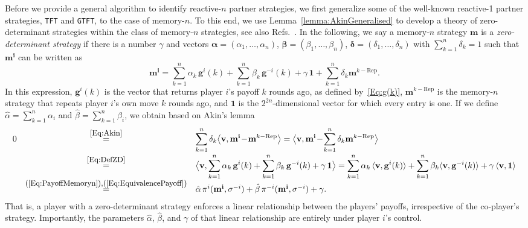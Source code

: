 \documentclass[9pt,twoside,lineno]{pnas-new}
\theoremstyle{plainCl1}
\theoremstyle{plainCl2}
\def\tft{\texttt{TFT}}
\def\gtft{\texttt{GTFT}}
\begin{document}
Before we provide a general algorithm to identify reactive-$n$ partner strategies, we first generalize some of the well-known reactive-1 partner strategies, \tft{} and \gtft{}, to the case of memory-$n$. 
To this end, we use Lemma~\ref{lemma:AkinGeneralised} to develop a theory of zero-determinant strategies within the class of memory-$n$ strategies, see also Refs.~\citep{ueda:RSOP:2021, Ueda:ORF:2022}.
In the following, we say a memory-$n$ strategy $\mathbf{m}$ is a {\it zero-determinant
strategy} if there is a number $\gamma$ and vectors $\boldsymbol{\alpha}\!=\!(\alpha_1,\ldots,\alpha_n)$, $\boldsymbol{\beta}\!=\!(\beta_1,\ldots,\beta_n)$, $\boldsymbol{\delta}\!=\!(\delta_1,\ldots,\delta_n)$ with $\sum_{k=1}^n \delta_k =1$ such that 
$\mathbf{m^{i}}$ can be written as
\begin{equation} \label{Eq:DefZD}
\mathbf{m^{i}} = \sum_{k=1}^n\alpha_k\, \mathbf{g}^i(k) + \sum_{k=1}^n\beta_k\, \mathbf{g}^{-i}(k) + \gamma\, \mathbf{1} + \sum_{k=1}^n \delta_k\mathbf{m}^{k-\text{Rep}}. 
\end{equation}
In this expression, $\mathbf{g}^i(k)$ is the vector that returns player $i$'s payoff $k$ rounds ago, as defined by~\eqref{Eq:g(k)}, $\mathbf{m}^{k-\text{Rep}}$ is the memory-$n$ strategy that repeats player $i$'s own move $k$ rounds ago, and $\mathbf{1}$ is the $2^{2n}$-dimensional vector for which every entry is one. If we define $\hat \alpha \!=\! \sum_{k=1}^n \alpha_i$ and $\hat \beta \!=\! \sum_{k=1}^n \beta_i$, we obtain based on Akin's lemma
\begin{equation} \label{Eq:PayoffZD}
\begin{array}{lcl}
0 
&\stackrel{\mbox{\small \eqref{Eq:Akin}}}{=}  
&\displaystyle \sum_{k=1}^n \delta_k \big\langle \mathbf{v} , \mathbf{m^i}\!-\!\mathbf{m}^{k-\text{Rep}}\big\rangle
 = \big\langle \mathbf{v} , \mathbf{m^i}\!-\!\sum_{k=1}^n \delta_k\mathbf{m}^{k-\text{Rep}}\big\rangle\\[0.4cm]
&\displaystyle \stackrel{\mbox{\small \eqref{Eq:DefZD}}}{=} 
&\displaystyle \big\langle \mathbf{v} ,\sum_{k=1}^n\alpha_k\, \mathbf{g}^i(k) + \sum_{k=1}^n\beta_k\, \mathbf{g}^{-i}(k) + \gamma\, \mathbf{1} \big\rangle
= \sum_{k=1}^n\alpha_k \, \langle \mathbf{v},\mathbf{g}^i(k)\rangle + \sum_{k=1}^n\beta_k \langle \mathbf{v},\mathbf{g}^{-i}(k) \rangle+\gamma\,\langle\mathbf{v},\mathbf{1}\rangle\\[0.3cm]
&\stackrel{\mbox{\small (\ref{Eq:PayoffMemoryn}),(\ref{Eq:EquivalencePayoff})}}{=} 
&\hat \alpha \, \pi^i(\mathbf{m^i},\sigma^{-i}) + \hat \beta \, \pi^{-i}(\mathbf{m^i},\sigma^{-i}) + \gamma.
\end{array}
\end{equation}
That is, a player with a zero-determinant strategy enforces a linear relationship between the players' payoffs, irrespective of the co-player's strategy. 
Importantly, the parameters $\hat \alpha$, $\hat \beta$, and $\gamma$ of that linear relationship are entirely under player $i$'s control.
\end{document}

